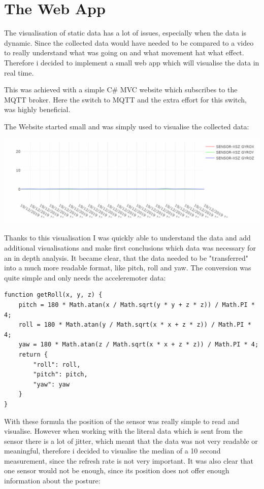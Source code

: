 \section{The Web App}

The visualisation of static data has a lot of issues, especially when the data is dynamic. Since the collected data would have needed to be compared to a video to really understand what was going on and what movement hat what effect. Therefore i decided to implement a small web app which will visualise the data in real time. 

This was achieved with a simple C\# MVC website which subscribes to the MQTT broker. Here the switch to MQTT and the extra effort for this switch, was highly beneficial.

The Website started small and was simply used to visualise the collected data:

\includegraphics[width=\linewidth]{images/WebVisualisation_SIMPLE.png}

Thanks to this visualisation I was quickly able to understand the data and add additional visualisations and make first conclusions which data was necessary for an in depth analysis. It became clear, that the data needed to be "transferred" into a much more readable format, like pitch, roll and yaw.
The conversion was quite simple and only needs the acceleremoter data:

\begin{lstlisting}
function getRoll(x, y, z) {
    pitch = 180 * Math.atan(x / Math.sqrt(y * y + z * z)) / Math.PI * 4;
    roll = 180 * Math.atan(y / Math.sqrt(x * x + z * z)) / Math.PI * 4;
    yaw = 180 * Math.atan(z / Math.sqrt(x * x + z * z)) / Math.PI * 4;
    return {
        "roll": roll,
        "pitch": pitch,
        "yaw": yaw
    }
}
\end{lstlisting}

With these formula the position of the sensor was really simple to read and visualise. However when working with the literal data which is sent from the sensor there is a lot of jitter, which meant that the data was not very readable or meaningful, therefore i decided to visualise the median of a 10 second measurement, since the refresh rate is not very important. It was also clear that one sensor would not be enough, since its position does not offer enough information about the posture: 

